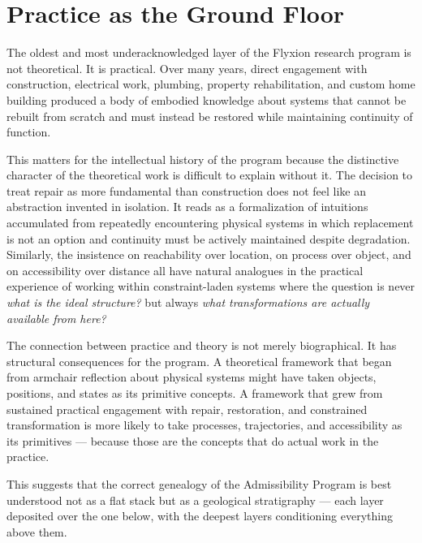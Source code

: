\documentclass[12pt, twoside]{article}
\begin{document}
\section{Practice as the Ground Floor}

The oldest and most underacknowledged layer of the Flyxion research program
is not theoretical. It is practical. Over many years, direct engagement with
construction, electrical work, plumbing, property rehabilitation, and
custom home building produced a body of embodied knowledge about systems that
cannot be rebuilt from scratch and must instead be restored while maintaining
continuity of function.

This matters for the intellectual history of the program because the
distinctive character of the theoretical work is difficult to explain without
it. The decision to treat repair as more fundamental than construction does
not feel like an abstraction invented in isolation. It reads as a
formalization of intuitions accumulated from repeatedly encountering physical
systems in which replacement is not an option and continuity must be actively
maintained despite degradation. Similarly, the insistence on reachability
over location, on process over object, and on accessibility over distance all
have natural analogues in the practical experience of working within
constraint-laden systems where the question is never \emph{what is the ideal
structure?} but always \emph{what transformations are actually available from
here?}

The connection between practice and theory is not merely biographical. It has
structural consequences for the program. A theoretical framework that began
from armchair reflection about physical systems might have taken objects,
positions, and states as its primitive concepts. A framework that grew from
sustained practical engagement with repair, restoration, and constrained
transformation is more likely to take processes, trajectories, and
accessibility as its primitives — because those are the concepts that do
actual work in the practice.

This suggests that the correct genealogy of the Admissibility Program is
best understood not as a flat stack but as a geological stratigraphy — each
layer deposited over the one below, with the deepest layers conditioning
everything above them.
\end{document}
